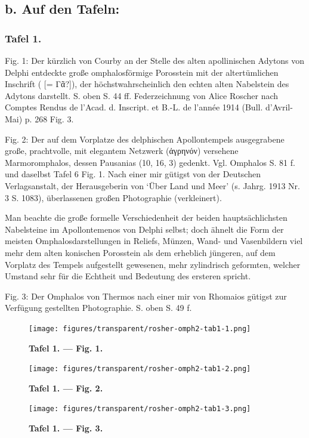 \documentclass[a4paper, 11pt, oneside]{article}
\newcommand*\svgAAA{}
\begin{document}
\subsection{b. Auf den Tafeln:}
\clearpage
\subsubsection{Tafel 1.}

Fig. 1: Der kürzlich von Courby an der Stelle des alten apollinischen Adytons von Delphi entdeckte große omphalosförmige Porosstein mit der altertümlichen Inschrift ($\svgAAA$ [= Γᾶ?]), der höchstwahrscheinlich den echten alten Nabelstein des Adytons darstellt. S. oben S. 44 ff. Federzeichnung von Alice Roscher nach Comptes Rendus de l'Acad. d. Inscript. et B.-L. de l'année 1914 (Bull. d'Avril-Mai) p. 268 Fig. 3.

Fig. 2: Der auf dem Vorplatze des delphischen Apollontempels ausgegrabene große, prachtvolle, mit elegantem Netzwerk (ἀγρηνόν) versehene Marmoromphalos, dessen Pausanias (10, 16, 3) gedenkt. Vgl. Omphalos S. 81 f. und daselbst Tafel 6 Fig. 1. Nach einer mir gütigst von der Deutschen Verlagsanstalt, der Herausgeberin von `Über Land und Meer' (s. Jahrg. 1913 Nr. 3 S. 1083), überlassenen großen Photographie (verkleinert).

Man beachte die große formelle Verschiedenheit der beiden hauptsächlichsten Nabelsteine im Apollontemenos von Delphi selbst; doch ähnelt die Form der meisten Omphalosdarstellungen in Reliefs, Münzen, Wand- und Vasenbildern viel mehr dem alten konischen Porosstein als dem erheblich jüngeren, auf dem Vorplatz des Tempels aufgestellt gewesenen, mehr zylindrisch geformten, welcher Umstand sehr für die Echtheit und Bedeutung des ersteren spricht.

Fig. 3: Der Omphalos von Thermos nach einer mir von Rhomaios gütigst zur Verfügung gestellten Photographie. S. oben S. 49 f.
\clearpage
\vspace*{\fill}
\begin{figure}[H]
\centering
\texttt{[image: figures/transparent/rosher-omph2-tab1-1.png]}
\caption{\bfseries Tafel 1. --- Fig. 1.}
\end{figure}
\vspace*{\fill}
\clearpage
\vspace*{\fill}
\begin{figure}[H]
\centering
\texttt{[image: figures/transparent/rosher-omph2-tab1-2.png]}
\caption{\bfseries Tafel 1. --- Fig. 2.}
\end{figure}
\vspace*{\fill}
\clearpage
\vspace*{\fill}
\begin{figure}[H]
\centering
\texttt{[image: figures/transparent/rosher-omph2-tab1-3.png]}
\caption{\bfseries Tafel 1. --- Fig. 3.}
\end{figure}
\vspace*{\fill}
\clearpage
\end{document}
